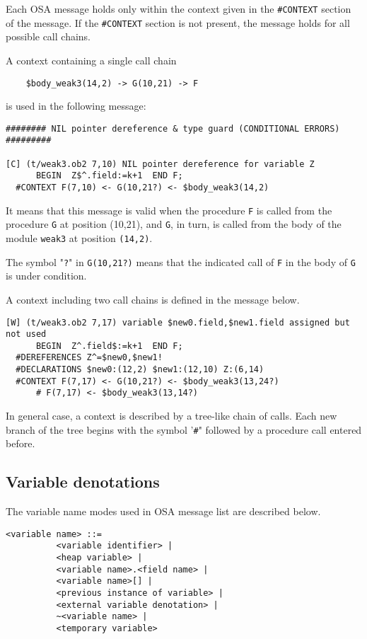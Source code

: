 Each OSA message holds only within the context given in the \verb'#CONTEXT' 
section of the message. If the \verb'#CONTEXT' section is
not present, the message holds for all possible call chains.

A context containing a single call chain 

\verb'    $body_weak3(14,2) -> G(10,21) -> F' 

is used in the following message: 

{\footnotesize
\begin{verbatim}
######## NIL pointer dereference & type guard (CONDITIONAL ERRORS) #########

[C] (t/weak3.ob2 7,10) NIL pointer dereference for variable Z
      BEGIN  Z$^.field:=k+1  END F;
  #CONTEXT F(7,10) <- G(10,21?) <- $body_weak3(14,2)
\end{verbatim}
} %

It means that this message is valid when the procedure \verb'F' is
called from the procedure \verb'G' at position (10,21), 
and \verb'G', in turn, is called from the body of the module \verb'weak3'
at position \verb'(14,2)'.

The symbol "\verb'?'" in \verb'G(10,21?)' means that the indicated call of 
\verb'F' in the body of \verb'G' is under condition. 

A context including two call chains is defined in the message below. 

{\footnotesize
\begin{verbatim}
[W] (t/weak3.ob2 7,17) variable $new0.field,$new1.field assigned but not used
      BEGIN  Z^.field$:=k+1  END F;
  #DEREFERENCES Z^=$new0,$new1!
  #DECLARATIONS $new0:(12,2) $new1:(12,10) Z:(6,14) 
  #CONTEXT F(7,17) <- G(10,21?) <- $body_weak3(13,24?)
      # F(7,17) <- $body_weak3(13,14?)
\end{verbatim}
} %

In general case, a context is described by a tree-like chain of calls.
Each new branch of the tree begins with the symbol '\verb'#'" followed by a
procedure call entered before. 


\subsection{Variable denotations}
\label{osa:msg:var}

The variable name modes used in OSA message list are described
below.

\begin{verbatim}
<variable name> ::= 
          <variable identifier> |
          <heap variable> |
          <variable name>.<field name> |
          <variable name>[] |
          <previous instance of variable> |
          <external variable denotation> |
          ~<variable name> |
          <temporary variable>
\end{verbatim}

